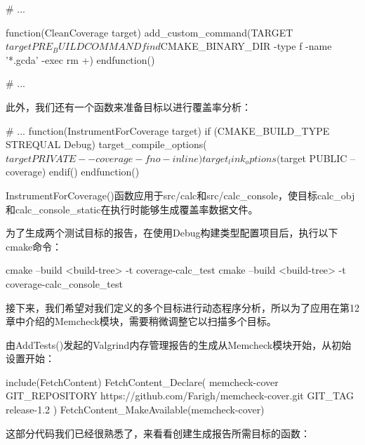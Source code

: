 \begin{cmake}
# ...

function(CleanCoverage target)
    add_custom_command(TARGET ${target} PRE_BUILD COMMAND
        find ${CMAKE_BINARY_DIR} -type f
        -name '*.gcda' -exec rm {} +)
endfunction()

# ...
\end{cmake}

此外，我们还有一个函数来准备目标以进行覆盖率分析：


\begin{cmake}
# ...
function(InstrumentForCoverage target)
    if (CMAKE_BUILD_TYPE STREQUAL Debug)
        target_compile_options(${target}
                               PRIVATE --coverage -fno-inline)
        target_link_options(${target} PUBLIC --coverage)
    endif()
endfunction()
\end{cmake}

InstrumentForCoverage()函数应用于src/calc和src/calc\_console，使目标calc\_obj和calc\_console\_static在执行时能够生成覆盖率数据文件。

为了生成两个测试目标的报告，在使用Debug构建类型配置项目后，执行以下cmake命令：

\begin{shell}
cmake --build <build-tree> -t coverage-calc_test
cmake --build <build-tree> -t coverage-calc_console_test
\end{shell}

接下来，我们希望对我们定义的多个目标进行动态程序分析，所以为了应用在第12章中介绍的Memcheck模块，需要稍微调整它以扫描多个目标。


由AddTests()发起的Valgrind内存管理报告的生成从Memcheck模块开始，从初始设置开始：


\begin{cmake}
include(FetchContent)
FetchContent_Declare(
    memcheck-cover
    GIT_REPOSITORY https://github.com/Farigh/memcheck-cover.git
    GIT_TAG release-1.2
)
FetchContent_MakeAvailable(memcheck-cover)
\end{cmake}

这部分代码我们已经很熟悉了，来看看创建生成报告所需目标的函数：


